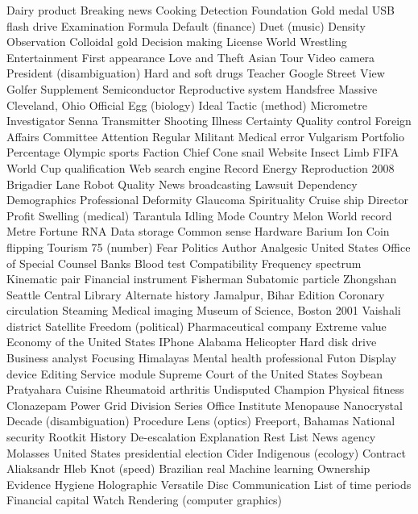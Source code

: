 Dairy product  Breaking news  Cooking  
Detection  Foundation  Gold medal  
USB flash drive  Examination  Formula  
Default (finance)  Duet (music)  Density  
Observation  Colloidal gold  Decision making  
License  World Wrestling Entertainment  First appearance  
Love and Theft  Asian Tour  Video camera  
President (disambiguation)  Hard and soft drugs  Teacher  
Google Street View  Golfer  Supplement  
Semiconductor  Reproductive system  Handsfree  
Massive  Cleveland, Ohio  Official  
Egg (biology)  Ideal  Tactic (method)  
Micrometre  Investigator  Senna  
Transmitter  Shooting  Illness  
Certainty  Quality control  Foreign Affairs Committee  
Attention  Regular  Militant  
Medical error  Vulgarism  Portfolio  
Percentage  Olympic sports  Faction  
Chief  Cone snail  Website  
Insect  Limb  FIFA World Cup qualification  
Web search engine  Record  Energy  
Reproduction  2008  Brigadier  
Lane  Robot  Quality  
News broadcasting  Lawsuit  Dependency  
Demographics  Professional  Deformity  
Glaucoma  Spirituality  Cruise ship  
Director  Profit  Swelling (medical)  
Tarantula  Idling  Mode  
Country  Melon  World record  
Metre  Fortune  RNA  
Data storage  Common sense  Hardware  
Barium  Ion  Coin flipping  
Tourism  75 (number)  Fear  
Politics  Author  Analgesic  
United States Office of Special Counsel  Banks  Blood test  
Compatibility  Frequency spectrum  Kinematic pair  
Financial instrument  Fisherman  Subatomic particle  
Zhongshan  Seattle Central Library  Alternate history  
Jamalpur, Bihar  Edition  Coronary circulation  
Steaming  Medical imaging  Museum of Science, Boston  
2001  Vaishali district  Satellite  
Freedom (political)  Pharmaceutical company  Extreme value  
Economy of the United States  IPhone  Alabama  
Helicopter  Hard disk drive  Business analyst  
Focusing  Himalayas  Mental health professional  
Futon  Display device  Editing  
Service module  Supreme Court of the United States  Soybean  
Pratyahara  Cuisine  Rheumatoid arthritis  
Undisputed Champion  Physical fitness  Clonazepam  
Power Grid  Division Series  Office  
Institute  Menopause  Nanocrystal  
Decade (disambiguation)  Procedure  Lens (optics)  
Freeport, Bahamas  National security  Rootkit  
History  De-escalation  Explanation  
Rest  List  News agency  
Molasses  United States presidential election  Cider  
Indigenous (ecology)  Contract  Aliaksandr Hleb  
Knot (speed)  Brazilian real  Machine learning  
Ownership  Evidence  Hygiene  
Holographic Versatile Disc  Communication  List of time periods  
Financial capital  Watch  Rendering (computer graphics)  
